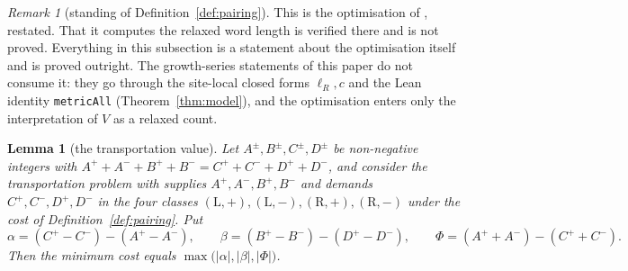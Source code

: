 \documentclass[11pt]{article}
\theoremstyle{plain}
\newtheorem{lemma}[theorem]{Lemma}
\theoremstyle{definition}
\theoremstyle{remark}
\newtheorem{remark}[theorem]{Remark}
\begin{document}
\begin{remark}[standing of Definition~\ref{def:pairing}]\label{rem:pairingstatus}
This is the optimisation of \cite[Metric formula, as verified]{Bonfioli2026a}, restated. That it computes the relaxed
word length is verified there and is not proved. Everything in this subsection is a statement about
the optimisation itself and is proved outright. The growth-series statements of this paper do not
consume it: they go through the site-local closed forms $\ell_R,c$ and the Lean identity
\texttt{metricAll} (Theorem~\ref{thm:model}), and the optimisation enters only the interpretation
of $V$ as a relaxed count.
\end{remark}

\begin{lemma}[the transportation value]\label{lem:transport}
Let $A^\pm,B^\pm,C^\pm,D^\pm$ be non-negative integers with
$A^++A^-+B^++B^-=C^++C^-+D^++D^-$, and consider the transportation problem with supplies
$A^+,A^-,B^+,B^-$ and demands $C^+,C^-,D^+,D^-$ in the four classes
$(\mathrm L,+),(\mathrm L,-),(\mathrm R,+),(\mathrm R,-)$ under the cost of
Definition~\textup{\ref{def:pairing}}. Put
\[
   \alpha=(C^+-C^-)-(A^+-A^-),\qquad
   \beta =(B^+-B^-)-(D^+-D^-),\qquad
   \Phi  =(A^++A^-)-(C^++C^-).
\]
Then the minimum cost equals $\max\bigl(|\alpha|,|\beta|,|\Phi|\bigr)$.
\end{lemma}
\end{document}
